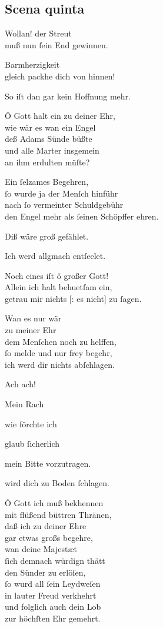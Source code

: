 \documentclass{ees}
\newenvironment{lyrics}[1]{%
  \subsection{#1}\nopagebreak%
  \begin{lyricslist}%
  \let\voice\item%
}{%
  \end{lyricslist}%
}
\begin{document}
\begin{lyrics}{Scena quinta}
  \voice[Schöpffer]
  Wollan! der Streut\\
  muß nun ſein End gewinnen.

  \voice[Gerecht.]
  Barmherzigkeit\\
  gleich packhe dich von hinnen!

  \voice[Adam]
  So iſt dan gar kein Hoffnung mehr.

  \voice[Barmh.]
  Ô Gott halt ein zu deiner Ehr,\\
  wie wär es wan ein Engel\\
  deß Adams Sünde büßte\\
  und alle Marter insgemein\\
  an ihm erdulten müſte?

  \voice[Gerecht.]
  Ein ſelzames Begehren,\\
  ſo wurde ja der Menſch hinführ\\
  nach ſo vermeinter Schuldgebühr\\
  den Engel mehr als ſeinen Schöpffer ehren.

  \voice[Schöpffer]
  Diß wäre groß gefählet.

  \voice[Adam]
  Ich werd allgmach entſeelet.

  \voice[Barmh.]
  Noch eines iſt ô großer Gott!\\
  Allein ich halt behuetſam ein,\\
  getrau mir nichts [: es nicht] zu ſagen.

  \voice[Schöpffer]
  Wan es nur wär\\
  zu meiner Ehr\\
  dem Menſchen noch zu helffen,\\
  ſo melde und nur frey begehr,\\
  ich werd dir nichts abſchlagen.

  \voice[Barmh.]
  Ach ach!

  \voice[Gerecht.]
  Mein Rach

  \voice[Barmh.]
  wie förchte ich

  \voice[Gerecht.]
  glaub ſicherlich

  \voice[Barmh.]
  mein Bitte vorzutragen.

  \voice[Gerecht.]
  wird dich zu Boden ſchlagen.

  \voice[Barmh.]
  Ô Gott ich muß bekhennen\\
  mit flüßend büttren Thränen,\\
  daß ich zu deiner Ehre\\
  gar etwas großs begehre,\\
  wan deine Majestæt\\
  ſich demnach würdign thätt\\
  den Sünder zu erlöſen,\\
  ſo wurd all ſein Leydweſen\\
  in lauter Freud verkhehrt\\
  und folglich auch dein Lob\\
  zur höchſten Ehr gemehrt.\\


\end{lyrics}
\end{document}
